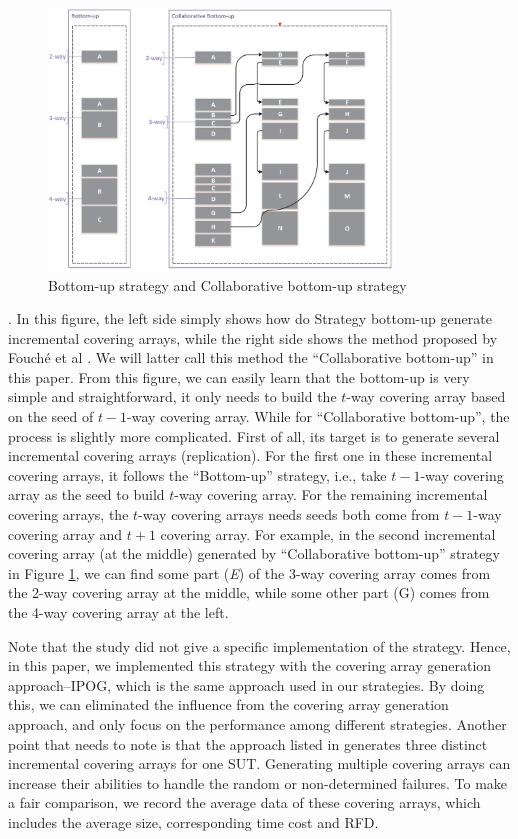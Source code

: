 \documentclass[conference]{IEEEtran}
\theoremstyle{definition}
\begin{document}
\begin{figure}
 \includegraphics[width=3.6in]{differentIncremental.eps}
\caption{Bottom-up strategy and Collaborative bottom-up strategy}
\label{comparebottomupwithcollaborative}
\end{figure}
.
In this figure, the left side simply shows how do Strategy bottom-up generate incremental covering arrays, while the right side shows the method proposed by Fouch{\'e} et al \cite{fouche2009incremental}. We will latter call this method the ``Collaborative bottom-up'' in this paper. From this figure, we can easily learn that the bottom-up is very simple and straightforward, it only needs to build the $t$-way covering array based on the seed of $t-1$-way covering array. While for ``Collaborative bottom-up'', the process is slightly more complicated. First of all, its target is to generate several incremental covering arrays (replication). For the first one in these incremental covering arrays, it follows the ``Bottom-up'' strategy, i.e., take $t-1$-way covering array as the seed to build $t$-way covering array. For the remaining incremental covering arrays, the $t$-way covering arrays needs seeds both come from $t-1$-way covering array and $t+1$ covering array. For example, in the second incremental covering array (at the middle) generated by ``Collaborative bottom-up'' strategy in Figure \ref{comparebottomupwithcollaborative}, we can find some part (\emph{E}) of the 3-way covering array comes from the 2-way covering array at the middle, while some other part (G) comes from the 4-way covering array at the left.

Note that the study \cite{fouche2009incremental} did not give a specific implementation of the strategy. Hence, in this paper, we implemented this strategy with the covering array generation approach--IPOG, which is the same approach used in our strategies.  By doing this, we can eliminated the influence from the covering array generation approach, and only focus on the performance among different strategies. Another point that needs to note is that the approach listed in \cite{fouche2009incremental} generates three distinct incremental covering arrays for one SUT. Generating multiple covering arrays can increase their abilities to handle the random or non-determined failures. To make a fair comparison, we record the average data of these covering arrays, which includes the average size, corresponding time cost and RFD.
\end{document}
